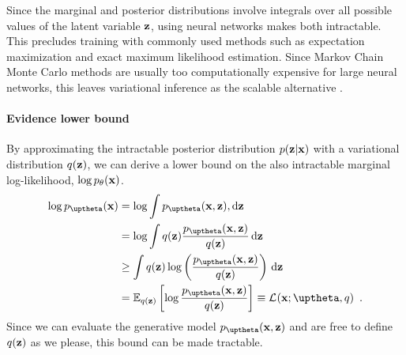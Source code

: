 Since the marginal and posterior distributions involve integrals over all possible values of the latent variable ${\mathbf{z}}$, using neural networks makes both intractable. 
This precludes training with commonly used methods such as expectation maximization and exact maximum likelihood estimation. Since Markov Chain Monte Carlo methods are usually too computationally expensive for large neural networks, this leaves variational inference as the scalable alternative \parencite{jordan_introduction_1999}. 



\paragraph{Evidence lower bound}
By approximating the intractable posterior distribution $p({\mathbf{z}}|{\mathbf{x}})$ with a variational distribution $q({\mathbf{z}})$, we can derive a lower bound on the also intractable marginal log-likelihood, $\log p_\theta({\mathbf{x}})$.
%
 \begin{align}
    \log p_\thetab(\xb)
    &= \log \int p_\thetab(\xb,\zb),\textrm{d}\zb \nonumber \\
    &= \log \int q(\zb) \frac{p_\thetab(\xb,\zb)}{q(\zb)}\,\textrm{d}\zb  \label{eq:marginal-likelihood-with-variational-approximation} \\
    &\geq \int q(\zb) \log \left( \frac{p_\thetab(\xb,\zb)}{q(\zb)} \right) \,\textrm{d}\zb \nonumber \\
    &= \mathbb{E}_{q(\zb)} \left[ \log \frac{p_\thetab(\xb,\zb)}{q(\zb)} \right] \equiv \mathcal{L}_{}(\xb;\thetab,q) \enspace . \label{eq:latent-variable-model-elbo}
\end{align}
%
Since we can evaluate the generative model $p_\thetab(\xb,\zb)$ and are free to define $q({\mathbf{z}})$ as we please, this bound can be made tractable. 

